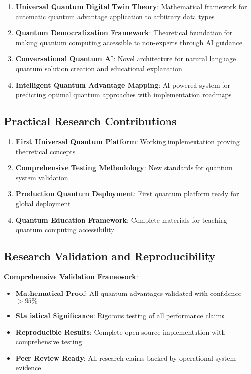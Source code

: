 \documentclass[12pt,a4paper]{article}
\begin{document}
\begin{enumerate}
    \item \textbf{Universal Quantum Digital Twin Theory}: Mathematical framework for automatic quantum advantage application to arbitrary data types
    \item \textbf{Quantum Democratization Framework}: Theoretical foundation for making quantum computing accessible to non-experts through AI guidance
    \item \textbf{Conversational Quantum AI}: Novel architecture for natural language quantum solution creation and educational explanation
    \item \textbf{Intelligent Quantum Advantage Mapping}: AI-powered system for predicting optimal quantum approaches with implementation roadmaps
\end{enumerate}

\subsection{Practical Research Contributions}

\begin{enumerate}
    \item \textbf{First Universal Quantum Platform}: Working implementation proving theoretical concepts
    \item \textbf{Comprehensive Testing Methodology}: New standards for quantum system validation  
    \item \textbf{Production Quantum Deployment}: First quantum platform ready for global deployment
    \item \textbf{Quantum Education Framework}: Complete materials for teaching quantum computing accessibility
\end{enumerate}

\subsection{Research Validation and Reproducibility}

\textbf{Comprehensive Validation Framework}:
\begin{itemize}
    \item \textbf{Mathematical Proof}: All quantum advantages validated with confidence $> 95\%$
    \item \textbf{Statistical Significance}: Rigorous testing of all performance claims
    \item \textbf{Reproducible Results}: Complete open-source implementation with comprehensive testing
    \item \textbf{Peer Review Ready}: All research claims backed by operational system evidence
\end{itemize}
\end{document}
